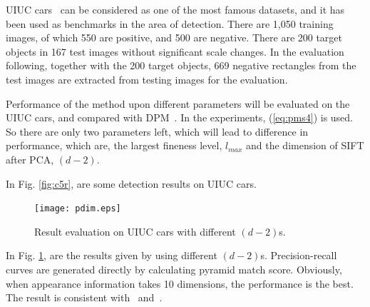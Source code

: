 \documentclass[paper]{ieice}
\begin{document}
UIUC cars~\cite{cds} can be considered as one of the most famous datasets, and it has been used as benchmarks in the area of detection.
There are 1,050 training images, of which 550 are positive, and 500 are negative. There are 200 target objects in 167 test images without significant scale changes. In the evaluation following, together with the 200 target objects, 669 negative rectangles from the test images are extracted from testing images for the evaluation.

Performance of the method upon different parameters will be evaluated on the UIUC cars, and compared with DPM~\cite{ac31}.
In the experiments, (\ref{eq:pms4}) is used. So there are only two parameters left, which will lead to difference in performance, which are, the largest fineness level, $l_{max}$ and the dimension of SIFT after PCA, $(d-2)$.

In Fig. \ref{fig:c5r}, are some detection results on UIUC cars.


\begin{figure}[!htbp]
\centering

\texttt{[image: pdim.eps]}


\caption[Result evaluation using different dimensions]{Result evaluation on UIUC cars with different $(d-2)$s.}
\label{fig:c52}
\end{figure}


In Fig. \ref{fig:c52}, are the results given by using different $(d-2)$s. Precision-recall curves are generated directly by calculating pyramid match score. Obviously, when appearance information takes 10 dimensions, the performance is the best. The result is consistent with~\cite{pmk} and~\cite{lwz}.
\end{document}
